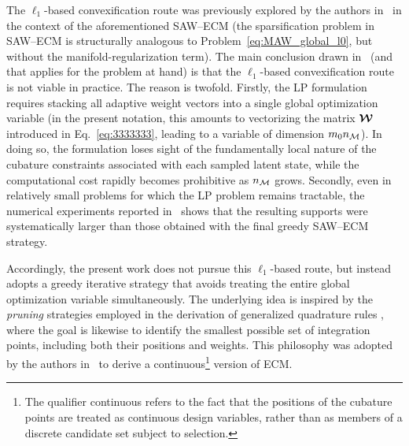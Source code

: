\documentclass[11pt,a4paper]{article}
\newcommand{\PROMPT}[1]{ }
\begin{document}

%
%
The \(\ell_1\)-based convexification route was previously explored by the
authors in~\cite{bravo2024subspace} in the context of the aforementioned
SAW--ECM (the sparsification problem  in SAW--ECM is structurally
analogous to Problem~\eqref{eq:MAW_global_l0}, but without the
manifold-regularization term). The main
conclusion drawn in~\cite{bravo2024subspace} (and that applies for the problem at hand) is that the \(\ell_1\)-based
convexification route is not viable in practice. The reason is twofold. Firstly, the LP formulation requires stacking all
adaptive weight vectors into a single global optimization variable (in the
present notation, this amounts to vectorizing the matrix \(\boldsymbol{\mathcal{W}}\) introduced
in Eq.~\eqref{eq:3333333}, leading to a variable of dimension \(m_0n_{\mathcal{M}}\)). In
doing so, the formulation loses sight of the fundamentally local nature of the
cubature constraints associated with each sampled latent state, while the
computational cost rapidly becomes prohibitive as \(n_{\mathcal{M}}\) grows. Secondly,
even in relatively small problems for which the LP problem remains tractable,
the numerical experiments reported in~\cite{bravo2024subspace} shows that the
resulting supports were systematically larger than those obtained with the
final greedy SAW--ECM strategy.


Accordingly, the present work does not pursue this \(\ell_1\)-based route, but
instead adopts a greedy iterative strategy that avoids treating the entire
global optimization variable simultaneously. The underlying idea is inspired by
the \emph{pruning} strategies employed in the derivation of generalized
quadrature rules \cite{bremer2010nonlinear,xiao2010numerical}, where the goal
is likewise to identify the smallest possible set of integration points,
including both their positions and weights. This philosophy was adopted by the
authors in~\cite{hernandez2024cecm} to derive a
continuous\footnote{The qualifier continuous refers to the fact that the
positions of the cubature points are treated as continuous design variables,
rather than as members of a discrete candidate set subject to selection.}
version of ECM.

\end{document}

